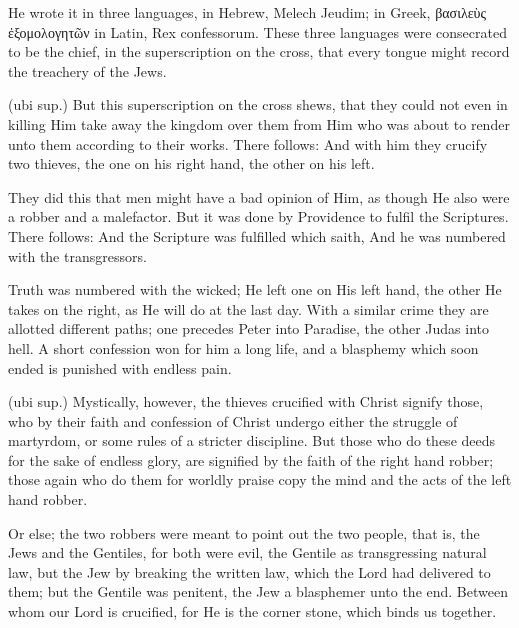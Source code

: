  He wrote it in three languages, in Hebrew, Melech Jeudim; in Greek, \textgreek{βασιλεὺς ἐξομολογητῶν} in Latin, Rex confessorum. These three languages were consecrated to be the chief, in the superscription on the cross, that every tongue might record the treachery of the Jews.

 (ubi sup.) But this superscription on the cross shews, that they could not even in killing Him take away the kingdom over them from Him who was about to render unto them according to their works. There follows: And with him they crucify two thieves, the one on his right hand, the other on his left.

 They did this that men might have a bad opinion of Him, as though He also were a robber and a malefactor. But it was done by Providence to fulfil the Scriptures. There follows: And the Scripture was fulfilled which saith, And he was numbered with the transgressors.

 Truth was numbered with the wicked; He left one on His left hand, the other He takes on the right, as He will do at the last day. With a similar crime they are allotted different paths; one precedes Peter into Paradise, the other Judas into hell. A short confession won for him a long life, and a blasphemy which soon ended is punished with endless pain.

 (ubi sup.) Mystically, however, the thieves crucified with Christ signify those, who by their faith and confession of Christ undergo either the struggle of martyrdom, or some rules of a stricter discipline. But those who do these deeds for the sake of endless glory, are signified by the faith of the right hand robber; those again who do them for worldly praise copy the mind and the acts of the left hand robber.

 Or else; the two robbers were meant to point out the two people, that is, the Jews and the Gentiles, for both were evil, the Gentile as transgressing natural law, but the Jew by breaking the written law, which the Lord had delivered to them; but the Gentile was penitent, the Jew a blasphemer unto the end. Between whom our Lord is crucified, for He is the corner stone, which binds us together.

 

